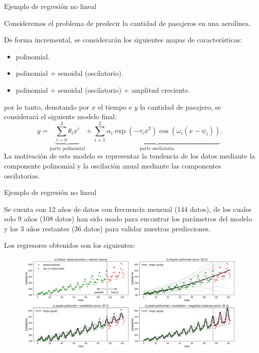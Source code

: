 \documentclass[9pt, handout]{beamer}
\begin{document}
\begin{frame}{Ejemplo de regresión no lineal}

Consideremos el problema de predecir la cantidad de pasajeros en una aerolínea.\\ \pause

De forma incremental, se considerarán los siguientes mapas de características:

\begin{itemize}
	\item polinomial.
	\item polinomial + senoidal (oscilatorio).
	\item polinomial + senoidal (oscilatorio) + amplitud creciente.
\end{itemize}
\pause
por lo tanto, denotando por $x$ el tiempo e $y$ la cantidad de pasajero, se considerará el siguiente modelo final:
\begin{equation*}
    y = \underbrace{\sum_{i=0}^3 \theta_i x^i}_\text{parte polinomial} + \underbrace{ \sum_{i=1}^2 \alpha_i\exp(-\tau_ix^2)\cos(\omega_i(x-\psi_i))}_\text{parte oscilatoria}.
\end{equation*} \pause
La motivación de este modelo es representar la tendencia de los datos mediante la componente polinomial y la oscilación anual mediante las componentes oscilatorias.\\

	
\end{frame}

\begin{frame}{Ejemplo de regresión no lineal}

Se cuenta con 12 años de datos con frecuencia mensual (144 datos), de los cuales solo 9 años (108 datos) han sido usado para encontrar los parámetros del modelo y los  3 años restantes (36 datos) para validar nuestras predicciones. \pause

Los regresores obtenidos son los siguientes:


\begin{figure}[H]
    \centering
    \includegraphics[width=1\textwidth, frame]{../img/cap2_pasajeros.pdf}
\end{figure}


\end{frame}
\end{document}
